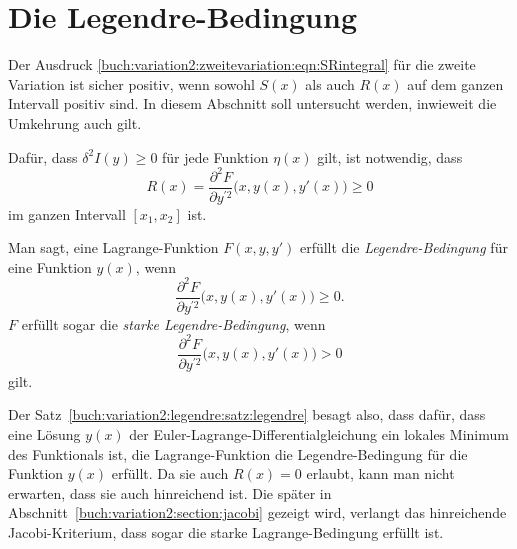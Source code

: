 %
%
%
\section{Die Legendre-Bedingung
\label{buch:variation2:section:legendre}}
Der Ausdruck \eqref{buch:variation2:zweitevariation:eqn:SRintegral}
für die zweite Variation ist sicher positiv, wenn sowohl $S(x)$
als auch $R(x)$ auf dem ganzen Intervall positiv sind.
In diesem Abschnitt soll untersucht werden, inwieweit die
Umkehrung auch gilt.

\begin{satz}[Legendre]
\label{buch:variation2:legendre:satz:legendre}
Dafür, dass $\delta^2I(y)\ge 0$ für jede Funktion $\eta(x)$ gilt, ist
notwendig, dass
\[
R(x)
=
\frac{\partial^2F}{\partial y^{\prime 2}}\bigl(x,y(x),y'(x)\bigr)
\ge
0
\]
im ganzen Intervall $[x_1,x_2]$ ist.
\end{satz}

\begin{definition}
Man sagt, eine Lagrange-Funktion $F(x,y,y')$ erfüllt die
{\em Legendre-Bedingung}
%
für eine Funktion $y(x)$, wenn 
\[
\frac{\partial^2 F}{\partial y^{\prime 2}}\bigl(x,y(x),y'(x)\bigr) \ge 0.
\]
$F$ erfüllt sogar die {\em starke Legendre-Bedingung}, wenn
\[
\frac{\partial^2 F}{\partial y^{\prime 2}}\bigl(x,y(x),y'(x)\bigr) > 0
\]
gilt.
\end{definition}

Der Satz~\ref{buch:variation2:legendre:satz:legendre} besagt also,
dass dafür, dass eine Lösung $y(x)$ der
Euler-Lagrange-Diffe\-ren\-tial\-gleichung
ein lokales Minimum des Funktionals ist, die Lagrange-Funktion
die Legendre-Bedingung für die Funktion $y(x)$ erfüllt.
Da sie auch $R(x)=0$ erlaubt, kann man nicht erwarten, dass sie auch
hinreichend ist.
Die später in Abschnitt~\ref{buch:variation2:section:jacobi} gezeigt wird,
verlangt das hinreichende Jacobi-Kriterium, dass sogar die starke
Lagrange-Bedingung erfüllt ist.

